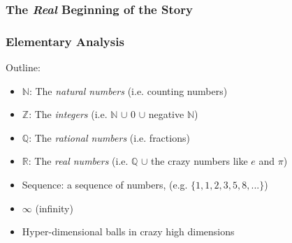 \documentclass[10pt]{beamer}
\def\R{\mathbb{R}}                     %
\def\N{\mathbb{N}}                     %
\def\Z{\mathbb{Z}}                     %
\def\Q{\mathbb{Q}}                     %
\begin{document}
\begin{frame}
  \frametitle{The \textit{Real} Beginning of the Story}

  \begin{minipage}{4in}
    \centering
    \hspace*{.2in}
  \end{minipage}
\end{frame}


\begin{frame}
  \frametitle{Elementary Analysis}

  Outline:
  \begin{itemize}
  \item $\N$: The \textit{natural numbers} (i.e. counting numbers)
  \item $\Z$: The \textit{integers} (i.e. $\N$ $\cup$ 0 $\cup$ negative $\N$)
  \item $\Q$: The \textit{rational numbers} (i.e. fractions)
  \item $\R$: The \textit{real numbers} (i.e. $\Q$ $\cup$ the crazy numbers like $e$ and $\pi$)
  \item Sequence: a sequence of numbers, (e.g. $\{1, 1, 2, 3, 5, 8, ...\}$)
  \item $\infty$ (infinity)
  \item Hyper-dimensional balls in crazy high dimensions
  \end{itemize}
\end{frame}
\end{document}
